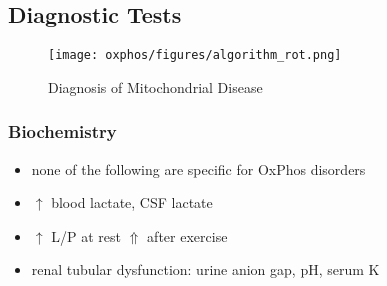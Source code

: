 \documentclass[12pt]{scrartcl}
\begin{document}
\subsection{Diagnostic Tests}
\label{sec:org8f195ea}
\begin{figure}[htbp]
\centering
\texttt{[image: oxphos/figures/algorithm\_rot.png]}
\caption{\label{fig:orga368f56}Diagnosis of Mitochondrial Disease}
\end{figure}


\subsubsection{Biochemistry}
\label{sec:orgcb8d08a}
\begin{itemize}
\item none of the following are specific for OxPhos disorders
\item \(\uparrow\) blood lactate, CSF lactate
\item \(\uparrow\) L/P at rest \(\Uparrow\) after exercise
\item renal tubular dysfunction: urine anion gap, pH, serum K
\end{itemize}
\end{document}
